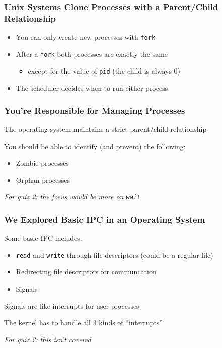   \begin{frame}
    \frametitle{Unix Systems Clone Processes with a Parent/Child Relationship}

    \begin{itemize}
      \item You can only create new processes with \texttt{fork}
      \item After a \texttt{fork} both processes are exactly the same
      \begin{itemize}
        \item except for the value of \texttt{pid} (the child is always 0)
      \end{itemize}
      \item The scheduler decides when to run either process
    \end{itemize}
  \end{frame}

  \begin{frame}
    \frametitle{You're Responsible for Managing Processes}

    The operating system maintains a strict parent/child relationship
    
    \vspace{2em}
    
    You should be able to identify (and prevent) the following:
    \begin{itemize}
      \item Zombie processes
      \item Orphan processes
    \end{itemize}

    \vspace{2em}

    \textit{For quiz 2: the focus would be more on \texttt{wait}}
  \end{frame}
  
  \begin{frame}
    \frametitle{We Explored Basic IPC in an Operating System}

    Some basic IPC includes:
    \begin{itemize}
      \item \texttt{read} and \texttt{write} through file descriptors (could be a regular file)
      \item Redirecting file descriptors for communcation
      \item Signals
    \end{itemize}

    \vspace{2em}

    Signals are like interrupts for user processes

    \hspace{2em} The kernel has to handle all 3 kinds of ``interrupts''

    \vspace{2em}

    \textit{For quiz 2: this isn't covered}
  \end{frame}

